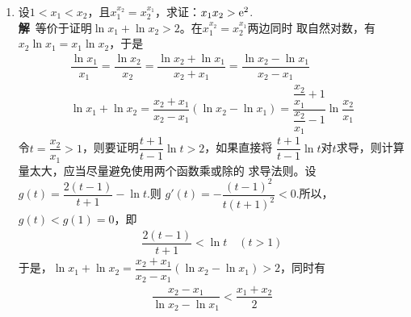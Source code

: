\begin{enumerate}[label={【\textbf{例\thechapter.\arabic*}】},
 leftmargin=\inteval{\myenumleftmargin}pt,
 itemsep=\inteval{\myenumitempsep}pt,
 itemindent=\inteval{\myenumitemindent}pt]
那就不存在绝对值不大于1的实根了。\\
\textbf{方法三}\ 使用三倍角公式，因为这个三次方程恰好缺少二次项。
假设$ x_1=\cos \theta \in [-1,1] $是方程的一个实根，那么$ f(x_1)
=f(\cos \theta)=\dfrac{1}{4}(4\cos^3 \theta-3\cos \theta)+c=\dfrac{1}{4}\cos3\theta + c=0 $,
因为$ \cos3\theta=\cos3\Big(\theta+\dfrac{2\pi}{3}\Big)=
\cos3\Big(\theta+\dfrac{4\pi}{3}\Big) $，
所以$ x_2=\cos(\theta+\dfrac{2\pi}{3}),x_3=\cos(\theta+\dfrac{4\pi}{3}) $也是方程的根，
这两个根的绝对值显然小于等于1.  而当$\theta=k\pi\, (k\in\textbf{Z})$时，$x_2=x_3=\pm \dfrac{1}{2}$，
那么$x_2,x_3$是否必然是原方程的一对重根呢？(比如$x_1$是第一个根，
$x_2,x_3$都是第二个根，而第3个根没有找到。)其实是重根，因为
$x_1=\cos\theta=\cos(k\pi)=\pm 1,\ c=\pm\dfrac{1}{4}$，
原方程就是\ref{2020高考存在重根的三次方程}式，
$x_2=x_3=\pm \dfrac{1}{2}$就是一对重根。\\
\textbf{注}：此题的背景是：$ n $次首一多项式在区间$ [-1,1] $上的最大值不小于$ \dfrac{1}{2^{n-1}} $.

\item 设$ 1<x_1<x_2 $，且$ x_1^{x_2}=x_2^{x_1} $，求证：$ x_1 x_2>\mathrm{e}^2 $. \\
\textbf{解}\ 等价于证明$\ln x_1+\ln x_2>2 $。在$ x_1^{x_2}=x_2^{x_1} $两边同时
取自然对数，有$ x_2\ln x_1=x_1\ln x_2 $，于是
\begin{gather}
	\dfrac{\ln x_1}{x_1}=\dfrac{\ln x_2}{x_2}=\dfrac{\ln x_2
		+\ln x_1}{x_2+x_1}= \dfrac{\ln x_2-\ln x_1}{x_2-x_1} 
	\label{lnx_x极值偏移1}\\
	\ln x_1+\ln x_2=\dfrac{x_2+x_1}{x_2-x_1}(\ln x_2-\ln x_1)=\dfrac{\dfrac{x_2}{x_1}+1}{\dfrac{x_2}{x_1}-1}
	\ln \dfrac{x_2}{x_1} \label{lnx_x极值偏移2}
\end{gather} 
令$ t=\dfrac{x_2}{x_1}>1 $，则要证明$ \dfrac{t+1}{t-1}\ln t>2 $，如果直接将
$ \dfrac{t+1}{t-1}\ln t $对$ t $求导，则计算量太大，应当尽量避免使用两个函数乘或除的
求导法则。设$ g(t)=\dfrac{2(t-1)}{t+1}-\ln t $.则
$ g'(t)=-\dfrac{(t-1)^2}{t(t+1)^2}<0 $.所以，$ g(t)<g(1)=0 $，即
\begin{align}\label{2(t-1)/(t+1)<lnt}
	\dfrac{2(t-1)}{t+1}<\ln t \quad (t>1)
\end{align}
于是，$\ln x_1+\ln x_2=\dfrac{x_2+x_1}{x_2-x_1}(\ln x_2-\ln x_1)>2 $，同时有
\begin{gather}\label{对数均值不等式右半部分}
	\dfrac{x_2-x_1}{\ln x_2-\ln x_1}<\dfrac{x_1+x_2}{2}
\end{gather}


\end{enumerate}
